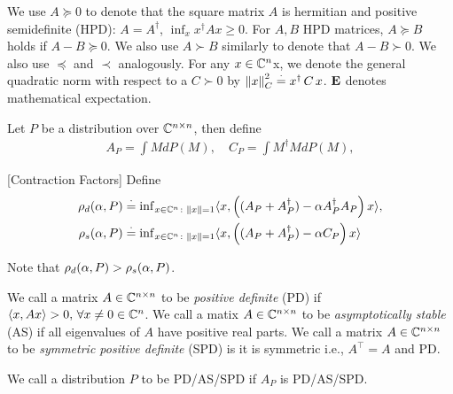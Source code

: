 \documentclass{article}
\begin{document}
We use $A\succeq 0$ to denote that the
square matrix $A$ is hermitian and positive semidefinite (HPD):
$A = A^\dag$, $\inf_x x^\dag A x\ge 0$.
For $A,B$ HPD matrices, $A\succeq B$ holds if $A-B\succeq 0$.
We also use $A\succ B$ similarly to denote that $A-B \succ 0$.
We also use $\preceq$ and $\prec$ analogously. For any $x\in\mathbb{C}^n$x, we denote the general quadratic norm with respect to a $C\succ 0$ by $\left\| x\right\|^2_C\stackrel{\cdot}{=} x^\dag\, C \,x$.
$\mathbf{E}$ denotes mathematical expectation.

\begin{definition}
Let $P$ be a distribution over $\mathbb{C}^{n\times n}$, then define
\begin{align*}
A_P=\int M dP(M),\quad C_P=\int M^\dag M dP(M),
\end{align*}
\end{definition}
\begin{definition}\label{contract}[Contraction Factors]
Define
\begin{align*}
\rho_d(\alpha,P)&\stackrel{\cdot}{=} {\inf}_{x\in\mathbb{C}^n\colon\left\| x\right\|=1}\langle x,\left((A_P+A_P^\dag)-\alpha A_P^\dag A_P\right)x\rangle,\\ \rho_s(\alpha,P)&\stackrel{\cdot}{=}{\inf}_{x\in \mathbb{C}^n\colon\left\| x\right\|=1}\langle x,\left((A_P+A_P^\dag)-\alpha C_P\right)x\rangle
\end{align*}
\end{definition}
Note that $\rho_d(\alpha,P)>\rho_s(\alpha,P)$.

\begin{definition}
We call a matrix $A\in \mathbb{C}^{n\times n}$ to be \emph{positive definite} (PD) if $\langle x,Ax\rangle >0,\,\forall x\neq 0 \in \mathbb{C}^{n}$. We call a matix $A\in \mathbb{C}^{n\times n}$ to be \emph{asymptotically stable} (AS) if all eigenvalues of $A$ have positive real parts. We call a matrix $A\in \mathbb{C}^{n\times n}$ to be \emph{symmetric positive definite} (SPD) is it is symmetric i.e., $A^\top=A$ and PD.
\end{definition}
\begin{definition}\label{distpd}
We call a distribution $P$ to be PD/AS/SPD if $A_P$ is PD/AS/SPD.
\end{definition}
\end{document}
